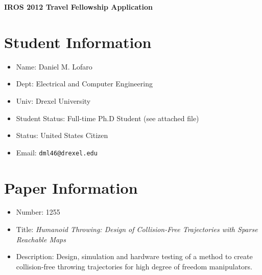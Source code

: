 \documentclass[11pt,a4paper,oneside]{report}
\begin{document}
\begin{center}
\LARGE{ \bf IROS 2012 Travel Fellowship Application }
\end{center}

\section*{Student Information}
\begin{itemize}
\item Name: Daniel M. Lofaro
\item Dept: Electrical and Computer Engineering
\item Univ: Drexel University
\item Student Status: Full-time Ph.D Student (see attached file)
\item Status: United States Citizen
\item Email: \tt{dml46@drexel.edu}
\end{itemize}


\section*{Paper Information}
\begin{itemize}
\item Number: 1255
\item Title: \textit{Humanoid Throwing: Design of Collision-Free Trajectories with Sparse Reachable Maps}
\item Description: Design, simulation and hardware testing of a method to create collision-free throwing trajectories for high degree of freedom manipulators. 
\end{itemize}
\end{document}
